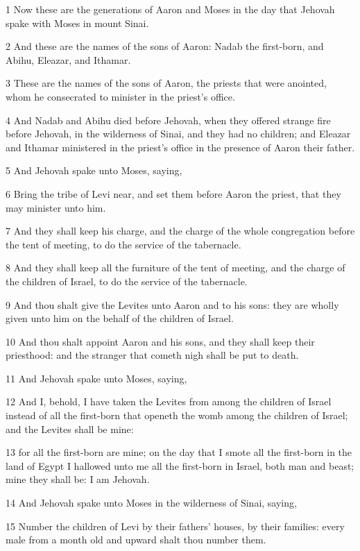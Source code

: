 \par 1 Now these are the generations of Aaron and Moses in the day that Jehovah spake with Moses in mount Sinai.
\par 2 And these are the names of the sons of Aaron: Nadab the first-born, and Abihu, Eleazar, and Ithamar.
\par 3 These are the names of the sons of Aaron, the priests that were anointed, whom he consecrated to minister in the priest's office.
\par 4 And Nadab and Abihu died before Jehovah, when they offered strange fire before Jehovah, in the wilderness of Sinai, and they had no children; and Eleazar and Ithamar ministered in the priest's office in the presence of Aaron their father.
\par 5 And Jehovah spake unto Moses, saying,
\par 6 Bring the tribe of Levi near, and set them before Aaron the priest, that they may minister unto him.
\par 7 And they shall keep his charge, and the charge of the whole congregation before the tent of meeting, to do the service of the tabernacle.
\par 8 And they shall keep all the furniture of the tent of meeting, and the charge of the children of Israel, to do the service of the tabernacle.
\par 9 And thou shalt give the Levites unto Aaron and to his sons: they are wholly given unto him on the behalf of the children of Israel.
\par 10 And thou shalt appoint Aaron and his sons, and they shall keep their priesthood: and the stranger that cometh nigh shall be put to death.
\par 11 And Jehovah spake unto Moses, saying,
\par 12 And I, behold, I have taken the Levites from among the children of Israel instead of all the first-born that openeth the womb among the children of Israel; and the Levites shall be mine:
\par 13 for all the first-born are mine; on the day that I smote all the first-born in the land of Egypt I hallowed unto me all the first-born in Israel, both man and beast; mine they shall be: I am Jehovah.
\par 14 And Jehovah spake unto Moses in the wilderness of Sinai, saying,
\par 15 Number the children of Levi by their fathers' houses, by their families: every male from a month old and upward shalt thou number them.
